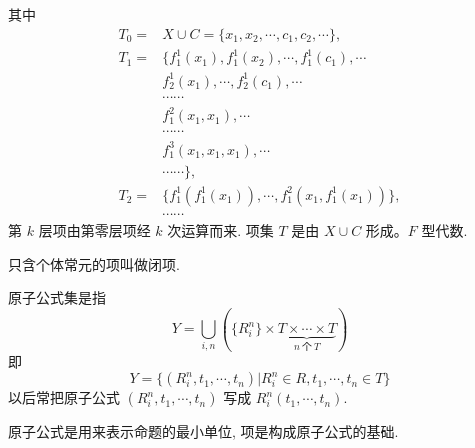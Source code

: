 \documentclass[
    mode=hazy,
    color=blue,
    device=normal,
    lang=cn
]{elegantnote}
\begin{document}
    其中
    $$
        \begin{aligned}
            T_0 = &X\cup C=\{x_1, x_2, \cdots, c_1, c_2, \cdots\},\\
            T_1 = &\{f_1^1(x_1), f_1^1(x_2), \cdots, f_1^1(c_1),\cdots\\
                  &f_2^1(x_1), \cdots, f_2^1(c_1), \cdots\\
                  &\cdots\cdots\\
                  &f_1^2(x_1, x_1), \cdots\\
                  &\cdots\cdots\\
                  &f_1^3(x_1, x_1, x_1), \cdots\\
                  &\cdots\cdots\},\\
            T_2 = &\{f_1^1(f_1^1(x_1)), \cdots, f_1^2(x_1, f_1^1(x_1))\},\\
                  &\cdots\cdots
        \end{aligned}
    $$
    第 $k$ 层项由第零层项经 $k$ 次运算而来. 项集 $T$ 是由 $X\cup C$ 形成。$F$ 型代数.
    \begin{definition}[闭项]
        只含个体常元的项叫做闭项.
    \end{definition}
    \begin{definition}[原子公式集]
        原子公式集是指
        $$
            Y=\bigcup_{i,n} \left(\{R_i^n\}\times \underbrace{T\times\cdots\times T}_{n\ \text{个}\ T} \right)
        $$
        即
        $$
            Y=\{(R_i^n, t_1, \cdots, t_n)\vert R_i^n\in R, t_1, \cdots, t_n \in T\}
        $$
        以后常把原子公式 $(R_i^n, t_1, \cdots, t_n)$ 写成 $R_i^n(t_1, \cdots, t_n)$.
    \end{definition}
    原子公式是用来表示命题的最小单位, 项是构成原子公式的基础.
\end{document}
